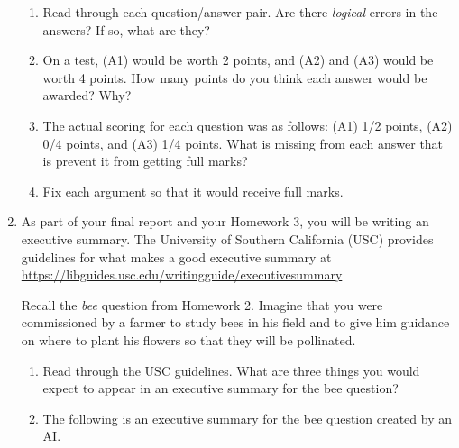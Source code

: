 \begin{enumerate}
\begin{enumerate}
		
		

	\end{enumerate}

	\bigskip
	\begin{enumerate}
		\item Read through each question/answer pair. Are there \emph{logical} errors in the answers? If so, what are they?
		\item On a test, (A1) would be worth 2 points, and (A2) and (A3) would be worth 4 points. How many points do you think
			each answer would be awarded? Why?
		\item The actual scoring for each question was as follows: (A1) 1/2 points, (A2) 0/4 points, and (A3) 1/4 points. What is missing from each
		answer that is prevent it from getting full marks?
		\item Fix each argument so that it would receive full marks.
	\end{enumerate}

	\item As part of your final report and your Homework 3, you will be writing an executive summary. The University of Southern California (USC)
	provides guidelines for what makes a good executive summary at \url{https://libguides.usc.edu/writingguide/executivesummary}
	
	Recall the \emph{bee} question from Homework 2. Imagine that you were commissioned by a farmer to study bees in his field and
	to give him guidance on where to plant his flowers so that they will be pollinated.

			\vspace{-.3cm}
	\begin{enumerate}
		\item Read through the USC guidelines. What are three things you would expect to appear in an executive summary for the bee question?
		\item The following is an executive summary for the bee question created by an AI. 


\end{enumerate}
\end{enumerate}
